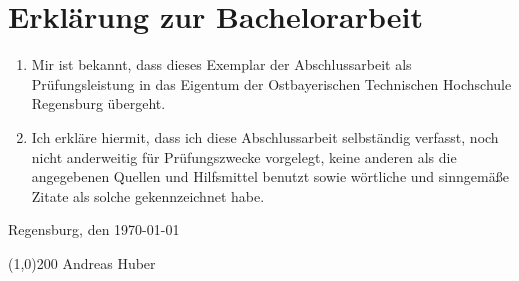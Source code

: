 \thispagestyle{empty}
\section*{Erklärung zur Bachelorarbeit}

\bigskip
\bigskip 
\bigskip 

\begin{enumerate}
    \item Mir ist bekannt, dass dieses Exemplar der Abschlussarbeit als
    Prüfungsleistung in das Eigentum der Ostbayerischen Technischen Hochschule
    Regensburg übergeht.
    \item Ich erkläre hiermit, dass ich diese Abschlussarbeit selbständig
    verfasst, noch nicht anderweitig für Prüfungszwecke vorgelegt, keine anderen
    als die angegebenen Quellen und Hilfsmittel benutzt sowie wörtliche und
    sinngemäße Zitate als solche gekennzeichnet habe.
\end{enumerate}

\bigskip 
\bigskip 
\bigskip 

Regensburg, den \today

\bigskip 
\bigskip

\line(1,0){200}
Andreas Huber